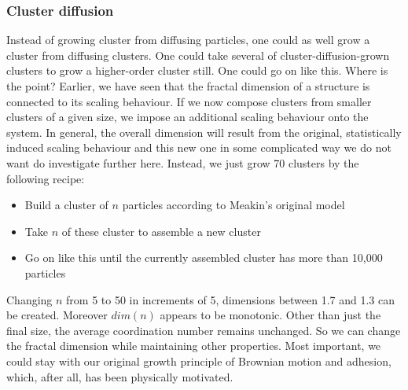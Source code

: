 \documentclass[twocolumn, 10pt]{scrartcl}
\begin{document}
            \subsubsection{Cluster diffusion}
                Instead of growing cluster from diffusing particles, one could as well grow a cluster from diffusing
                clusters. One could take several of cluster-diffusion-grown clusters to grow a higher-order cluster
                still. One could go on like this. Where is the point? Earlier, we have seen that the fractal dimension
                of a structure is connected to its scaling behaviour. If we now compose clusters from smaller clusters
                of a given size, we impose an additional scaling behaviour onto the system. In general, the overall
                dimension will result from the original, statistically induced scaling behaviour and this new one in
                some complicated way we do not want do investigate further here. Instead, we just grow 70 clusters by the
                following recipe:
                \begin{itemize}
                    \item Build a cluster of $n$ particles according to Meakin's original model
                    \item Take $n$ of these cluster to assemble a new cluster
                    \item Go on like this until the currently assembled cluster has more than 10,000 particles
                \end{itemize}
                Changing $n$ from 5 to 50 in increments of 5, dimensions between 1.7 and 1.3 can be created. Moreover
                $dim(n)$ appears to be monotonic. Other than just the final size, the average coordination number
                remains unchanged. So we can change the fractal dimension while maintaining other properties.
                Most important, we could stay with our original growth principle of Brownian motion and adhesion,
                which, after all, has been physically motivated.
\end{document}
